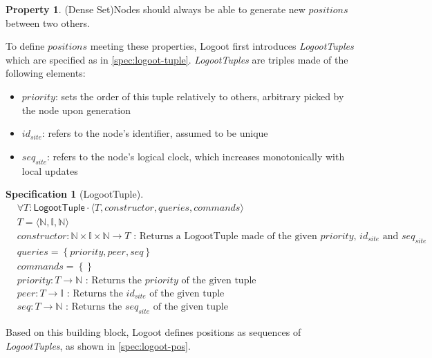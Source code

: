 \documentclass{article}
\newcommand{\commands}[1]{commands = \set{#1}}
\newcommand{\fnspec}[3]{#1: #2 \text{ : #3}}
\newcommand{\queries}[1]{queries = \set{#1}}
\newcommand{\set}[1]{\left\{#1\right\}} %
\newcommand{\spectuple}[1]{\tuple{#1, constructor, queries, commands}}
\newcommand{\tuple}[1]{\langle #1 \rangle}
\theoremstyle{definition}
\theoremstyle{definition}
\newcounter{propertycounter}
\theoremstyle{definition}
\newtheorem{property}[propertycounter]{Property}
\newcounter{specificationcounter}
\theoremstyle{definition}
\newtheorem{specification}[specificationcounter]{Specification}
\begin{document}
\begin{property}(Dense Set)\label{prop:dense-set}
    Nodes should always be able to generate new $positions$ between two others.
\end{property}

To define $positions$ meeting these properties, Logoot first introduces \emph{LogootTuples} which are specified as in \autoref{spec:logoot-tuple}.
\emph{LogootTuples} are triples made of the following elements:
\begin{itemize}
    \item $priority$: sets the order of this tuple relatively to others, arbitrary picked by the node upon generation
    \item $id_{site}$: refers to the node's identifier, assumed to be unique
    \item $seq_{site}$: refers to the node's logical clock, which increases monotonically with local updates
\end{itemize}

\begin{specification}[LogootTuple]
    \begin{align*}
    &\forall T: \mathsf{LogootTuple} \cdot \spectuple{T}\\
    &T = \tuple{\mathbb{N}, \mathbb{I}, \mathbb{N}}\\
    &\fnspec{constructor}{\mathbb{N} \times \mathbb{I} \times \mathbb{N} \to T}{Returns a LogootTuple made of the given $priority$, $id_{site}$ and $seq_{site}$}\\
    &\queries{priority, peer, seq}\\
    &\commands{}\\
    &\fnspec{priority}{T \to \mathbb{N}}{Returns the $priority$ of the given tuple}\\
    &\fnspec{peer}{T \to \mathbb{I}}{Returns the $id_{site}$ of the given tuple}\\
    &\fnspec{seq}{T \to \mathbb{N}}{Returns the $seq_{site}$ of the given tuple}
    \end{align*}
    \label{spec:logoot-tuple}
\end{specification}

Based on this building block, Logoot defines positions as sequences of \emph{LogootTuples}, as shown in \autoref{spec:logoot-pos}.
\end{document}
